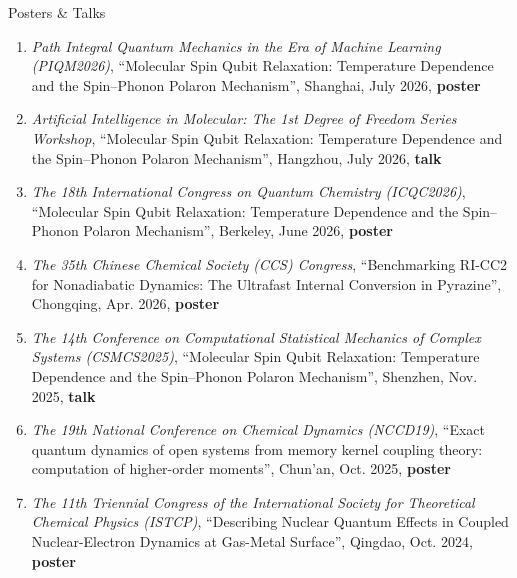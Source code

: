 \documentclass{resume}
\begin{document}
\begin{rSection}{Posters \& Talks}
\begin{enumerate}
    \item \emph{Path Integral Quantum Mechanics in the Era of Machine Learning (PIQM2026)}, ``Molecular Spin Qubit Relaxation: Temperature Dependence and the Spin–Phonon Polaron Mechanism'', Shanghai, July 2026, \textbf{poster} 
    \item \emph{Artificial Intelligence in Molecular: The 1st Degree of Freedom Series Workshop}, ``Molecular Spin Qubit Relaxation: Temperature Dependence and the Spin–Phonon Polaron Mechanism'', Hangzhou, July 2026, \textbf{talk} 
    \item \emph{The 18th International Congress on Quantum Chemistry (ICQC2026)}, ``Molecular Spin Qubit Relaxation: Temperature Dependence and the Spin–Phonon Polaron Mechanism'', Berkeley, June 2026, \textbf{poster} 
    \item \emph{The 35th Chinese Chemical Society (CCS) Congress}, ``Benchmarking RI-CC2 for Nonadiabatic Dynamics: The Ultrafast Internal Conversion in Pyrazine'', Chongqing, Apr. 2026, \textbf{poster} 
    \item \emph{The 14th Conference on Computational Statistical Mechanics of Complex Systems (CSMCS2025)}, ``Molecular Spin Qubit Relaxation: Temperature Dependence and the Spin–Phonon Polaron Mechanism'', Shenzhen, Nov. 2025, \textbf{talk} 
    \item \emph{The 19th National Conference on Chemical Dynamics (NCCD19)}, ``Exact quantum dynamics of open systems from memory kernel coupling theory: computation of higher-order moments'', Chun'an, Oct. 2025, \textbf{poster} 
    \item \emph{The 11th Triennial Congress of the International Society for Theoretical Chemical Physics (ISTCP)}, ``Describing Nuclear Quantum Effects in Coupled Nuclear-Electron Dynamics at Gas-Metal Surface'', Qingdao, Oct. 2024, \textbf{poster} 
\end{enumerate}
\end{rSection}
\end{document}
